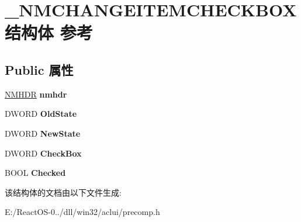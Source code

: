 \hypertarget{struct___n_m_c_h_a_n_g_e_i_t_e_m_c_h_e_c_k_b_o_x}{}\section{\+\_\+\+N\+M\+C\+H\+A\+N\+G\+E\+I\+T\+E\+M\+C\+H\+E\+C\+K\+B\+O\+X结构体 参考}
\label{struct___n_m_c_h_a_n_g_e_i_t_e_m_c_h_e_c_k_b_o_x}
\subsection*{Public 属性}
\begin{DoxyCompactItemize}
\item 
\mbox{\label{struct___n_m_c_h_a_n_g_e_i_t_e_m_c_h_e_c_k_b_o_x_a347c546764c4a9d1e8188f239c803b89}} 
\hyperlink{structtag_n_m_h_d_r}{N\+M\+H\+DR} {\bfseries nmhdr}
\item 
\mbox{\label{struct___n_m_c_h_a_n_g_e_i_t_e_m_c_h_e_c_k_b_o_x_aa89e5fd0b948666492f83d80c543149f}} 
D\+W\+O\+RD {\bfseries Old\+State}
\item 
\mbox{\label{struct___n_m_c_h_a_n_g_e_i_t_e_m_c_h_e_c_k_b_o_x_a9816b42c84682795a89cd87e6595dc3b}} 
D\+W\+O\+RD {\bfseries New\+State}
\item 
\mbox{\label{struct___n_m_c_h_a_n_g_e_i_t_e_m_c_h_e_c_k_b_o_x_a50c9616e129bd2dc625083c1dadf36e7}} 
D\+W\+O\+RD {\bfseries Check\+Box}
\item 
\mbox{\label{struct___n_m_c_h_a_n_g_e_i_t_e_m_c_h_e_c_k_b_o_x_a841bcdaefa536cb9de8a12f2c267af09}} 
B\+O\+OL {\bfseries Checked}
\end{DoxyCompactItemize}


该结构体的文档由以下文件生成\+:\begin{DoxyCompactItemize}
\item 
E\+:/\+React\+O\+S-\/0../dll/win32/aclui/precomp.\+h\end{DoxyCompactItemize}
